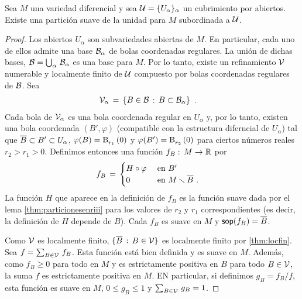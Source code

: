 \begin{propoParticionesVarDif}\label{thm:particionesvardif}
	Sea $M$ una variedad diferencial y sea
	$\cal{U}=\{U_{\alpha}\}_{\alpha}$ un cubrimiento por abiertos. Existe
	una partici\'{o}n suave de la unidad para $M$ subordinada a $\cal{U}$.
\end{propoParticionesVarDif}

\begin{proof}
	Los abiertos $U_{\alpha}$ son subvariedades abiertas de $M$.
	En particular, cada uno de ellos admite una base $\cal{B}_{\alpha}$
	de bolas coordenadas regulares. La uni\'{o}n de dichas bases,
	$\cal{B}=\bigcup_{\alpha}\,\cal{B}_{\alpha}$ es una base para $M$.
	Por lo tanto, existe un refinamiento $\cal{V}$ numerable y
	localmente finito de $\cal{U}$ compuesto por bolas coordenadas
	regulares de $\cal{B}$. Sea 
	\begin{align*}
		\cal{V}_{\alpha} & \,=\,\left\lbrace
			B\in\cal{B}\,:\,B\subset \cal{B}_{\alpha}
			\right\rbrace
		\text{ .}
	\end{align*}
	Cada bola de $\cal{V}_{\alpha}$ es una bola coordenada regular en
	$U_{\alpha}$ y, por lo tanto, existen una bola coordenada
	$(B',\varphi)$ (compatible con la estructura diferncial de
	$U_{\alpha}$) tal que $\clos{B}\subset B'\subset U_{\alpha}$,
	$\varphi(B)=\bola{r_{1}}{0}$ y $\varphi(B')=\bola{r_{2}}{0}$
	para ciertos n\'{u}meros reales $r_{2}>r_{1}>0$. Definimos
	entonces una funci\'{o}n $f_{B}:\,M\rightarrow\bb{R}$ por
	\begin{align*}
		f_{B} & \,=\,
			\begin{cases}
				H\circ\varphi & \text{ en }B' \\
				0 & \text{ en }M\setmin\clos{B}\text{ .}
			\end{cases}
	\end{align*}
	La funci\'{o}n $H$ que aparece en la definici\'{o}n de $f_{B}$ es
	la funci\'{o}n suave dada por el lema \ref{thm:particionesenriii}
	para los valores de $r_{2}$ y $r_{1}$ correspondientes (es decir, la
	definici\'{o}n de $H$ depende de $B$). Cada $f_{B}$ es suave en $M$ y
	$\soporte{f_{B}}=\clos{B}$.

	Como $\cal{V}$ es localmente finito, $\{\clos{B}\,:\,B\in\cal{V}\}$
	es localmente finito por \ref{thm:locfin}. Sea
	$f=\sum_{B\in\cal{V}}\,f_{B}$. Esta funci\'{o}n est\'{a} bien
	definida y es suave en $M$. Adem\'{a}s, como $f_{B}\geq 0$ para todo
	en $M$ y es estrictamente positiva en $B$ para todo $B\in\cal{V}$,
	la suma $f$ es estrictamente positiva en $M$. EN particular,
	si definimos $g_{B}=f_{B}/f$, esta funci\'{o}n es suave en $M$,
	$0\leq g_{B}\leq 1$ y $\sum_{B\in\cal{V}}\,g_{B}=1$.


\end{proof}
